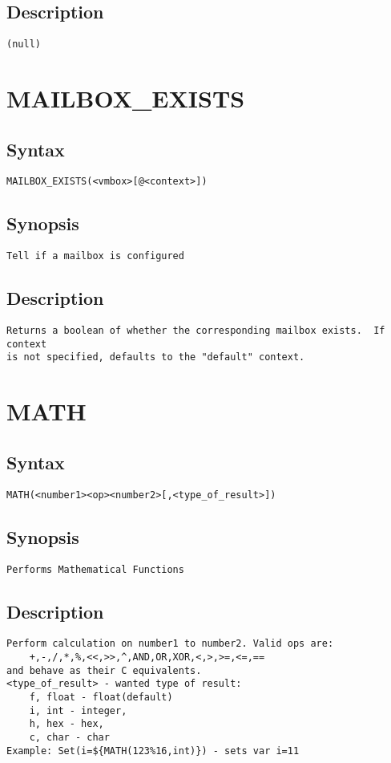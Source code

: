 \subsection{Description}
\begin{verbatim}
(null)
\end{verbatim}


\section{MAILBOX\_EXISTS}
\subsection{Syntax}
\begin{verbatim}
MAILBOX_EXISTS(<vmbox>[@<context>])
\end{verbatim}
\subsection{Synopsis}
\begin{verbatim}
Tell if a mailbox is configured
\end{verbatim}
\subsection{Description}
\begin{verbatim}
Returns a boolean of whether the corresponding mailbox exists.  If context
is not specified, defaults to the "default" context.

\end{verbatim}


\section{MATH}
\subsection{Syntax}
\begin{verbatim}
MATH(<number1><op><number2>[,<type_of_result>])
\end{verbatim}
\subsection{Synopsis}
\begin{verbatim}
Performs Mathematical Functions
\end{verbatim}
\subsection{Description}
\begin{verbatim}
Perform calculation on number1 to number2. Valid ops are: 
    +,-,/,*,%,<<,>>,^,AND,OR,XOR,<,>,>=,<=,==
and behave as their C equivalents.
<type_of_result> - wanted type of result:
	f, float - float(default)
	i, int - integer,
	h, hex - hex,
	c, char - char
Example: Set(i=${MATH(123%16,int)}) - sets var i=11
\end{verbatim}


